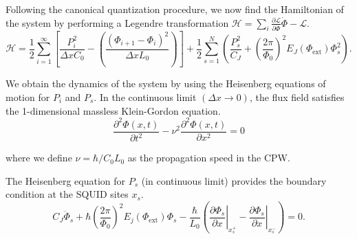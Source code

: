 Following the canonical quantization procedure, we now find the Hamiltonian of the system by performing a Legendre transformation $\mathcal{H}=\sum_{i}\frac{\partial\mathcal{L}}{\partial\dot{\Phi}} \dot{\Phi} - \mathcal{L}$.
\begin{equation}
\mathcal{H}=\frac{1}{2}\sum_{i=1}^{\infty}\left[\frac{P_i^2}{\Delta x C_{0}} -\left(\frac{\left(\Phi_{i+1}-\Phi_{i}\right)^{2}}{\Delta x L_{0}}\right)\right] 
 + \frac{1}{2} \sum_{s=1}^{N}\left(\frac{P_s^2}{C_J}+\left(\frac{2\pi}{\Phi_{0}}\right)^{2} E_J\left(\Phi_{\text{ext}}\right) \Phi_{s}^{2}\right).
\end{equation}

We obtain the dynamics of the system by using the Heisenberg equations of motion for $P_i$ and $P_s$. In the continuous limit $(\Delta x \to 0)$, the flux field satisfies the 1-dimensional massless Klein-Gordon equation.
\begin{equation}
\frac{\partial^2\Phi(x,t)}{\partial t^2} - \nu^2 \frac{\partial^2\Phi(x,t)}{\partial x^2} =0
\end{equation}

where we define $\nu = \hbar / C_0 L_0$ as the propagation speed in the CPW.

The Heisenberg equation for $P_s$ (in continuous limit) provides the boundary condition at the SQUID sites $x_s$.
\begin{equation}\label{eq:BC_field}
C_{J} \ddot{\Phi}_{s}+\hbar\left(\frac{2 \pi}{\Phi_{0}}\right)^{2} E_{j}\left(\Phi_{\text{ext}}\right) \Phi_{s} -\frac{\hbar}{L_{0}}\left(\left.\frac{\partial \Phi_{s}}{\partial x}\right|_{x_s^{+}}-\left.\frac{\partial \Phi_{s}}{\partial x}\right|_{x_s^{-}}\right)=0.
\end{equation}


